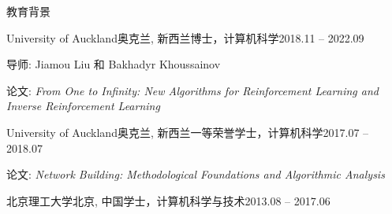 \documentclass{resume} %
\begin{document}

\begin{rSection}{教育背景}

\begin{rSubsection}{University of Auckland}{奥克兰, 新西兰}{博士，计算机科学}{2018.11 -- 2022.09}%
\item 导师: Jiamou Liu 和 Bakhadyr Khoussainov
\item 论文: {\em From One to Infinity: New Algorithms for Reinforcement Learning and Inverse Reinforcement Learning}
\end{rSubsection}

\begin{rSubsection}{University of Auckland}{奥克兰, 新西兰}{一等荣誉学士，计算机科学}{2017.07 -- 2018.07}
\item 论文: {\em Network Building: Methodological Foundations and Algorithmic Analysis}
\end{rSubsection}

\begin{rSubsection}{北京理工大学}{北京, 中国}{学士，计算机科学与技术}{2013.08 -- 2017.06}
\end{rSubsection}
\end{rSection}
\end{document}
